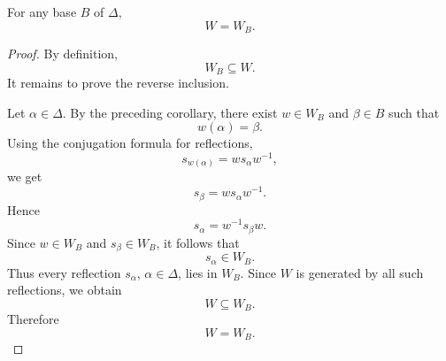 \begin{corollary}
    For any base \(B\) of \(\Delta\),
    \[
        W=W_B.
    \]
\end{corollary}

\begin{proof}
    By definition,
    \[
        W_B\subseteq W.
    \]
    It remains to prove the reverse inclusion.

    Let \(\alpha\in\Delta\). By the preceding corollary, there exist
    \(w\in W_B\) and \(\beta\in B\) such that
    \[
        w(\alpha)=\beta.
    \]
    Using the conjugation formula for reflections,
    \[
        s_{w(\alpha)}
        =
        w s_\alpha w^{-1},
    \]
    we get
    \[
        s_\beta
        =
        w s_\alpha w^{-1}.
    \]
    Hence
    \[
        s_\alpha
        =
        w^{-1}s_\beta w.
    \]
    Since \(w\in W_B\) and \(s_\beta\in W_B\), it follows that
    \[
        s_\alpha\in W_B.
    \]
    Thus every reflection \(s_\alpha\), \(\alpha\in\Delta\), lies in \(W_B\).
    Since \(W\) is generated by all such reflections, we obtain
    \[
        W\subseteq W_B.
    \]
    Therefore
    \[
        W=W_B.
    \]
\end{proof}

